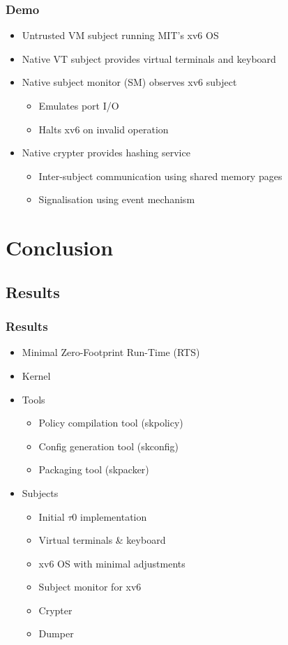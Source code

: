 \documentclass[xcolor={dvipsnames}]{beamer}
\begin{document}
\begin{frame}\frametitle{Demo}
\begin{itemize}
	\item Untrusted VM subject running MIT's xv6 OS
	\item Native VT subject provides virtual terminals and keyboard
	\item Native subject monitor (SM) observes xv6 subject
	\begin{itemize}
		\item Emulates port I/O
		\item Halts xv6 on invalid operation
	\end{itemize}
	\item Native crypter provides hashing service
	\begin{itemize}
		\item Inter-subject communication using shared memory pages
		\item Signalisation using event mechanism
	\end{itemize}
\end{itemize}
\begin{center}
	
\end{center}
\end{frame}

\section{Conclusion}
\subsection{Results}
\begin{frame}\frametitle{Results}
\begin{itemize}
	\item Minimal Zero-Footprint Run-Time (RTS)
	\item Kernel
	\item Tools
	\begin{itemize}
		\item Policy compilation tool (skpolicy)
		\item Config generation tool (skconfig)
		\item Packaging tool (skpacker)
	\end{itemize}
	\item Subjects
	\begin{itemize}
		\item Initial $\tau$0 implementation
		\item Virtual terminals \& keyboard
		\item xv6 OS with minimal adjustments
		\item Subject monitor for xv6
		\item Crypter
		\item Dumper
	\end{itemize}
\end{itemize}
\end{frame}
\end{document}
